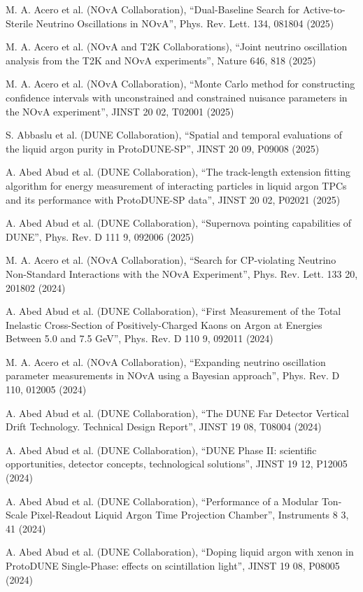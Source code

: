 \begin{list2}
\item M. A. Acero et al. (NOvA Collaboration), ``Dual-Baseline Search for Active-to-Sterile Neutrino Oscillations in NOvA'', Phys. Rev. Lett. 134, 081804 (2025)
\item M. A. Acero et al. (NOvA and T2K Collaborations), ``Joint neutrino oscillation analysis from the T2K and NOvA experiments'', Nature 646, 818 (2025)
\item M. A. Acero et al. (NOvA Collaboration), ``Monte Carlo method for constructing confidence intervals with unconstrained and constrained nuisance parameters in the NOvA experiment'', JINST 20 02, T02001 (2025)
\item S. Abbaslu et al. (DUNE Collaboration), ``Spatial and temporal evaluations of the liquid argon purity in ProtoDUNE-SP'', JINST 20 09, P09008 (2025)
\item A. Abed Abud et al. (DUNE Collaboration), ``The track-length extension fitting algorithm for energy measurement of interacting particles in liquid argon TPCs and its performance with ProtoDUNE-SP data'', JINST 20 02, P02021 (2025)
\item A. Abed Abud et al. (DUNE Collaboration), ``Supernova pointing capabilities of DUNE'', Phys. Rev. D 111 9, 092006 (2025)
\item M. A. Acero et al. (NOvA Collaboration), ``Search for CP-violating Neutrino Non-Standard Interactions with the NOvA Experiment'', Phys. Rev. Lett. 133 20, 201802 (2024)
\item A. Abed Abud et al. (DUNE Collaboration), ``First Measurement of the Total Inelastic Cross-Section of Positively-Charged Kaons on Argon at Energies Between 5.0 and 7.5 GeV'', Phys. Rev. D 110 9, 092011 (2024)
\item M. A. Acero et al. (NOvA Collaboration), ``Expanding neutrino oscillation parameter measurements in NOvA using a Bayesian approach'', Phys. Rev. D 110, 012005 (2024)
\item A. Abed Abud et al. (DUNE Collaboration), ``The DUNE Far Detector Vertical Drift Technology. Technical Design Report'', JINST 19 08, T08004 (2024)
\item A. Abed Abud et al. (DUNE Collaboration), ``DUNE Phase II: scientific opportunities, detector concepts, technological solutions'', JINST 19 12, P12005 (2024)
\item A. Abed Abud et al. (DUNE Collaboration), ``Performance of a Modular Ton-Scale Pixel-Readout Liquid Argon Time Projection Chamber'', Instruments 8 3, 41 (2024)
\item A. Abed Abud et al. (DUNE Collaboration), ``Doping liquid argon with xenon in ProtoDUNE Single-Phase: effects on scintillation light'', JINST 19 08, P08005 (2024)
\end{list2}

